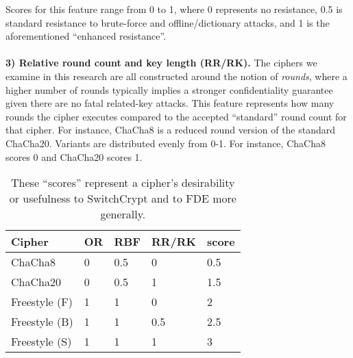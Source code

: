 Scores for this feature range from 0 to 1, where 0 represents no resistance, 0.5
is standard resistance to brute-force and offline/dictionary attacks, and 1 is
the aforementioned ``enhanced resistance''.\\
\\
\textbf{3) Relative round count and key length (RR/RK).} The ciphers we examine
in this research are all constructed around the notion of \emph{rounds}, where a
higher number of rounds typically implies a stronger confidentiality guarantee
given there are no fatal related-key attacks. This feature represents how many
rounds the cipher executes compared to the accepted ``standard'' round count for
that cipher. For instance, ChaCha8 is a reduced round version of the standard
ChaCha20. Variants are distributed evenly from 0-1. For instance, ChaCha8 scores
0 and ChaCha20 scores 1\@.

\begin{table}[]
  \begin{tabular}{@{}lllll@{}}
  \toprule
  \textbf{Cipher} & \textbf{OR} & \textbf{RBF} & \textbf{RR/RK} & \textbf{score} \\ \midrule
  ChaCha8         & 0           & 0.5          & 0              & 0.5            \\
  ChaCha20        & 0           & 0.5          & 1              & 1.5            \\
  Freestyle (F)   & 1           & 1            & 0              & 2              \\
  Freestyle (B)   & 1           & 1            & 0.5            & 2.5            \\
  Freestyle (S)   & 1           & 1            & 1              & 3
  \end{tabular}
  \caption{These ``scores'' represent a cipher's desirability or usefulness to
  SwitchCrypt and to FDE more generally.}
  \label{tbl:security-quant}
\end{table}
